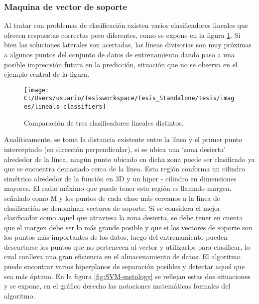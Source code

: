 \subsubsection{Maquina de vector de soporte}

Al tratar con problemas de clasificación existen varios clasificadores
lineales que ofrecen respuestas correctas pero diferentes, como se
expone en la figura \ref{fig:lineals-classifiers}. Si bien las soluciones
laterales son acertadas, las líneas divisorias son muy próximas a
algunos puntos del conjunto de datos de entrenamiento dando paso a
una posible imprecisión futura en la predicción, situación que no
se observa en el ejemplo central de la figura. 

\begin{figure}
\begin{centering}
\texttt{[image: C:/Users/usuario/Tesisworkspace/Tesis\_Standalone/tesis/images/lineals-classifiers]}
\par\end{centering}

\caption{Comparación de tres clasificadores lineales distintos.\label{fig:lineals-classifiers}}
\end{figure}


Analíticamente, se toma la distancia existente entre la línea y el
primer punto interceptado (en dirección perpendicular), si se ubica
una ‘zona desierta’ alrededor de la línea, ningún punto ubicado en
dicha zona puede ser clasificado ya que se encuentra demasiado cerca
de la línea. Esta región conforma un cilindro simétrico alrededor
de la función en 3D y un hiper - cilindro en dimensiones mayores.
El radio máximo que puede tener esta región es llamado margen, señalado
como M y los puntos de cada clase más cercanos a la línea de clasificación
se denominan vectores de soporte. Si se considera el mejor clasificador
como aquel que atraviesa la zona desierta, se debe tener en cuenta
que el margen debe ser lo más grande posible y que si los vectores
de soporte son los puntos más importantes de los datos, luego del
entrenamiento pueden descartarse los puntos que no pertenecen al vector
y utilizarlos para clasificar, lo cual conlleva una gran eficiencia
en el almacenamiento de datos. El algoritmo puede encontrar varios
hiperplanos de separación posibles y detectar aquel que sea más óptimo.
En la figura \ref{fig:SVM-metology} se reflejan estas dos situaciones
y se expone, en el gráfico derecho las notaciones matemáticas formales
del algoritmo. 

